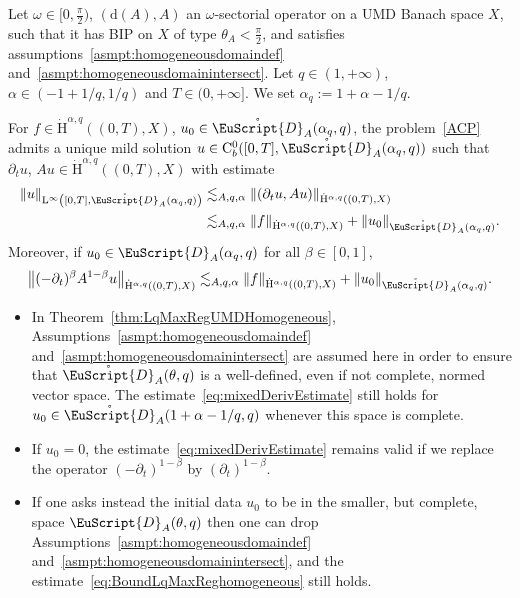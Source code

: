 \documentclass[AHL,Unicode,longabstracts,published]{cedram}
\newcommand{\rmH}{\mathrm{H}}%
\newcommand{\rmd}{\mathrm{d}}
\newcommand{\rmL}{\mathrm{L}}
\newcommand{\rmC}{\mathrm{C}}
\newcommand{\rgeusD}{\mathring{\eus{D}}}
\newcommand{\eus}{\EuScript}
\begin{document}
\begin{theo}\label{thm:LqMaxRegUMDHomogeneous}
Let $\omega\in [0,\frac{\pi}{2})$, $(\rmd(A),A)$ an $\omega$-sectorial operator on a UMD Banach space $X$, such that it has BIP on $X$ of type $\theta_A<\frac{\pi}{2}$, and satisfies assumptions~\eqref{asmpt:homogeneousdomaindef} and~\eqref{asmpt:homogeneousdomainintersect}. Let $q\in(1,+\infty)$, $\alpha\in(-1+1/q,1/q)$ and $T\in(0,+\infty]$. We set $\alpha_q:= 1+\alpha-1/q$.

For $f\in\dot{\rmH}^{\alpha,q}((0,T),X)$, $u_0\in \rgeusD_{A}(\alpha_q,q)$, the problem~\eqref{ACP} admits a unique mild solution $u\in \rmC ^0_b([0,T],\rgeusD_{A}(\alpha_q,q))$ such that $\partial_t u$, $Au \in \dot{\rmH}^{\alpha,q}((0,T),X)$ with estimate
\begin{equation}\label{eq:BoundLqMaxReghomogeneous}
\begin{split}
\| u \|_{\rmL^{\infty}\left([0,T],\rgeusD_{A}(\alpha_q,q)\right)} &\lesssim_{A,q,\alpha} \| (\partial_t u, Au)\|_{\dot{\rmH}^{\alpha,q}((0,T),X)}\\
&\lesssim_{A,q,\alpha}
\| f\|_{\dot{\rmH}^{\alpha,q}((0,T),X)}
+ \| u_0\|_{\rgeusD_{A}(\alpha_q,q)}.
\end{split}
\end{equation}
Moreover, if $u_0\in {\eus{D}}_{A}(\alpha_q,q)$ for all $\beta\in[0,1]$,
\begin{align}\label{eq:mixedDerivEstimate}
\left\| (-\partial_t)^{\beta} A^{1-\beta} u\right\|_{\dot{\rmH}^{\alpha,q}((0,T),X)} \lesssim_{A,q,\alpha} \| f\|_{\dot{\rmH}^{\alpha,q}((0,T),X)} + \| u_0\|_{\rgeusD_{A}(\alpha_q,q)} .
\end{align}
\end{theo}

\begin{rema}\leavevmode
\begin{itemize}
\item In Theorem~\ref{thm:LqMaxRegUMDHomogeneous}, Assumptions~\ref{asmpt:homogeneousdomaindef} and~\ref{asmpt:homogeneousdomainintersect} are assumed here in order to ensure that $\rgeusD_{A}(\theta,q)$ is a well-defined, even if not complete, normed vector space. The estimate~\eqref{eq:mixedDerivEstimate} still holds for $u_0\in \rgeusD_{A}(1+\alpha-1/q,q)$ whenever this space is complete.


\item If $u_0=0$, the estimate~\eqref{eq:mixedDerivEstimate} remains valid if we replace the operator $(-\partial_t)^{1-\beta}$ by $(\partial_t)^{1-\beta}$.

\item If one asks instead the initial data $u_0$ to be in the smaller, but complete, space ${\eus{D}}_{A}(\theta,q)$ then one can drop Assumptions~\ref{asmpt:homogeneousdomaindef} and~\ref{asmpt:homogeneousdomainintersect}, and the estimate~\eqref{eq:BoundLqMaxReghomogeneous} still holds.
\end{itemize}
\end{rema}
\end{document}
